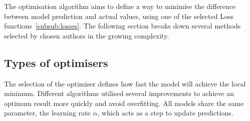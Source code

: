 The optimisation algorithm aims to define a way to minimise the difference between model prediction and actual values, using one of the selected Loss functions~\ref{subsub:losses}.
The following section breaks down several methods selected by chosen authors in the growing complexity.
\subsection{Types of optimisers}
The selection of the optimiser defines how fast the model will achieve the local minimum.
Different algorithms utilised several improvements to achieve an optimum result more quickly and avoid overfitting.
All models share the same parameter, the learning rate $\alpha$, which acts as a step to update predictions.

